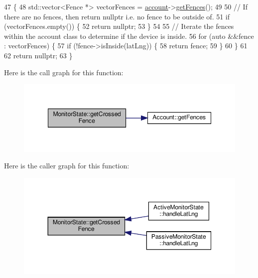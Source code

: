 \begin{DoxyCode}
47 \{
48     std::vector<Fence *> vectorFences = \hyperlink{class_monitor_state_a41128d4942ec0d5b107c63d1d95af811}{account}->\hyperlink{class_account_a5117acc0c4ef7be21c5339bd9ae84e40}{getFences}();
49 
50     \textcolor{comment}{// If there are no fences, then return nullptr i.e. no fence to be outside of.}
51     \textcolor{keywordflow}{if} (vectorFences.empty()) \{
52         \textcolor{keywordflow}{return} \textcolor{keyword}{nullptr};
53     \}
54 
55     \textcolor{comment}{// Iterate the fences within the account class to determine if the device is inside.}
56     \textcolor{keywordflow}{for} (\textcolor{keyword}{auto} &&fence : vectorFences) \{
57         \textcolor{keywordflow}{if} (!fence->isInside(latLng)) \{
58             \textcolor{keywordflow}{return} fence;
59         \}
60     \}
61 
62     \textcolor{keywordflow}{return} \textcolor{keyword}{nullptr};
63 \}
\end{DoxyCode}
Here is the call graph for this function\+:
\nopagebreak
\begin{figure}[H]
\begin{center}
\leavevmode
\includegraphics[width=348pt]{dd/d45/class_monitor_state_a332c5f42bf46cd217e36f300e5279766_cgraph}
\end{center}
\end{figure}
Here is the caller graph for this function\+:
\nopagebreak
\begin{figure}[H]
\begin{center}
\leavevmode
\includegraphics[width=350pt]{dd/d45/class_monitor_state_a332c5f42bf46cd217e36f300e5279766_icgraph}
\end{center}
\end{figure}
\mbox{\label{class_monitor_state_acb6d3a4de174058cb5b167fc04929ddb}} 
